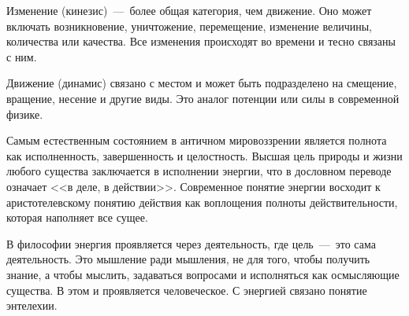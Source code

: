 Изменение (кинезис)~---~более общая категория, чем движение. Оно может включать возникновение, уничтожение, перемещение, изменение величины, количества или качества. Все изменения происходят во времени и тесно связаны с ним.


Движение (динамис) связано с местом и может быть подразделено на смещение, вращение, несение и другие виды. Это аналог потенции или силы в современной физике.


Самым естественным состоянием в античном мировоззрении является полнота как исполненность, завершенность и целостность. Высшая цель природы и жизни любого существа заключается в исполнении энергии, что в дословном переводе означает <<в деле, в действии>>. Современное понятие энергии восходит к аристотелевскому понятию действия как воплощения полноты действительности, которая наполняет все сущее.


В философии энергия проявляется через деятельность, где цель~---~это сама деятельность. Это мышление ради мышления, не для того, чтобы получить знание, а чтобы мыслить, задаваться вопросами и исполняться как осмысляющие существа. В этом и проявляется человеческое. С энергией связано понятие энтелехии.

